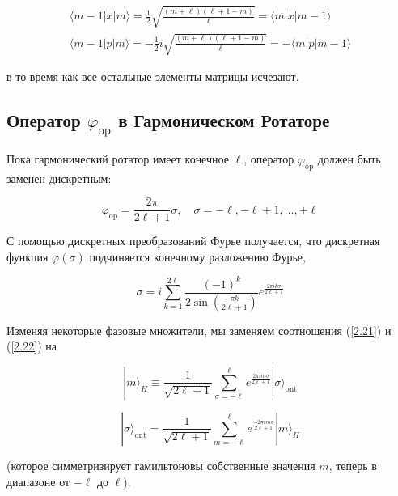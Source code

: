 \documentclass[main.tex]{subfiles}
\begin{document}
\begin{equation}\label{13.4}
	\begin{array}{l}{\langle m-1|x| m\rangle=\frac{1}{2} \sqrt{\frac{(m+\ell)(\ell+1-m)}{\ell}}=\langle m|x| m-1\rangle} \\ {\langle m-1|p| m\rangle=-\frac{1}{2} i \sqrt{\frac{(m+\ell)(\ell+1-m)}{\ell}}=-\langle m|p| m-1\rangle}\end{array}
\end{equation}

в то время как все остальные элементы матрицы исчезают.


\subsection{Оператор $\varphi_{\mathrm{op}}$ в Гармоническом Ротаторе}\label{ch13.1}

Пока гармонический ротатор имеет конечное $\ell$, оператор $\varphi_{\mathrm{op}}$ должен быть заменен дискретным:

\begin{equation}\label{13.5}
	\varphi_{\mathrm{op}}=\frac{2 \pi}{2 \ell+1} \sigma, \quad \sigma=-\ell,-\ell+1, \ldots,+\ell
\end{equation}
         
С помощью дискретных преобразований Фурье получается, что дискретная функция $\varphi(\sigma)$ подчиняется конечному разложению Фурье,

\begin{equation}\label{13.6}
	\sigma=i \sum_{k=1}^{2 \ell} \frac{(-1)^{k}}{2 \sin \left(\frac{\pi k}{2 \ell+1}\right)} e^{\frac{2 \pi i k \sigma}{2 \ell+1}}
\end{equation}

Изменяя некоторые фазовые множители, мы заменяем соотношения (\ref{2.21}) и (\ref{2.22}) на

\begin{equation}\label{13.7}
	|m\rangle_{H} \equiv \frac{1}{\sqrt{2 \ell+1}} \sum_{\sigma=-\ell}^{\ell} e^{\frac{2 \pi i m \sigma}{2 \ell+1}}|\sigma\rangle_{\mathrm{ont}}
\end{equation}

\begin{equation}\label{13.8}
	|\sigma\rangle_{\mathrm{ont}}=\frac{1}{\sqrt{2 \ell+1}} \sum_{m=-\ell}^{\ell} e^{\frac{-2 \pi i m \sigma}{2 \ell+1}}|m\rangle_{H}
\end{equation}

(которое симметризирует гамильтоновы собственные значения $m$, теперь в диапазоне от $-\ell$ до $\ell$).
\end{document}
